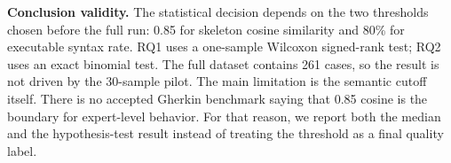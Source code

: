 \textbf{Conclusion validity.} The statistical decision depends on the two thresholds chosen before the full run: 0.85 for skeleton cosine similarity and 80\% for executable syntax rate. RQ1 uses a one-sample Wilcoxon signed-rank test; RQ2 uses an exact binomial test. The full dataset contains 261 cases, so the result is not driven by the 30-sample pilot. The main limitation is the semantic cutoff itself. There is no accepted Gherkin benchmark saying that 0.85 cosine is the boundary for expert-level behavior. For that reason, we report both the median and the hypothesis-test result instead of treating the threshold as a final quality label.
